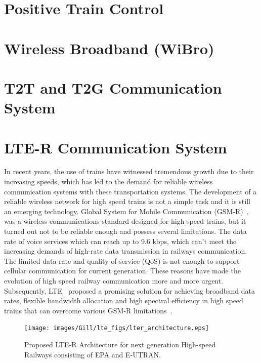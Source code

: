 \section{Positive Train Control}

\section{Wireless Broadband (WiBro)}

\section{T2T and T2G Communication System}

\section{LTE-R Communication System}

In recent years, the use of trains have witnessed tremendous growth due to their increasing speeds, which has led to the demand for reliable wireless communication systems with these transportation systems. The development of a reliable wireless network for high speed trains is not a simple task and it is still an emerging technology. Global System for Mobile
Communication (GSM-R)~\cite{trlter1}, was a wireless communications standard designed for high speed trains, but it turned out not to be reliable enough and possess several limitations. The data rate of voice services which can reach up to 9.6 kbps, which can't meet the increasing demands of high-rate data transmission in railways communication. The limited data rate and quality of service (QoS) is not enough to support cellular communication for current generation. These reasons have made the evolution of high speed railway communication more and more urgent.  Subsequently, LTE~\cite{trlter2} proposed a promising solution for achieving broadband data rates, flexible bandwidth allocation and high spectral efficiency in high speed trains that can overcome various GSM-R limitations~\cite{arlter3,inplter4}.

\begin{figure}[!ht]
\centering
\texttt{[image: images/Gill/lte\_figs/lter\_architecture.eps]} 
\caption{Proposed LTE-R Architecture for next generation High-speed Railways consisting of EPA and E-UTRAN.}
\label{ltearch}
\end{figure}

